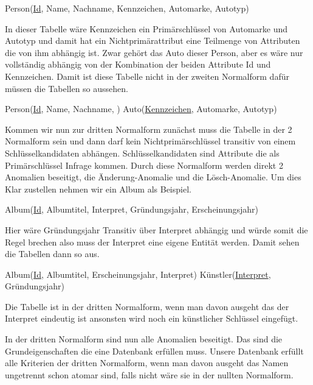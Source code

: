 \begin{small}
	Person(\uline{Id}, Name, Nachname, Kennzeichen, Automarke, Autotyp)
\end{small}

In dieser Tabelle wäre Kennzeichen ein Primärschlüssel von Automarke und Autotyp und damit hat ein Nichtprimärattribut eine Teilmenge von Attributen die von ihm abhängig ist. Zwar gehört das Auto dieser Person, aber es wäre nur vollständig abhängig von der Kombination der beiden Attribute Id und Kennzeichen. Damit ist diese Tabelle nicht in der zweiten Normalform dafür müssen die Tabellen so aussehen.

\begin{small}
	Person(\uline{Id}, Name, Nachname, )\newline
	Auto(\uline{Kennzeichen}, Automarke, Autotyp)
\end{small}

Kommen wir nun zur dritten Normalform zunächst muss die Tabelle in der 2 Normalform sein und dann darf kein Nichtprimärschlüssel transitiv von einem Schlüsselkandidaten abhängen. Schlüsselkandidaten sind Attribute die als Primärschlüssel Infrage kommen. Durch diese Normalform werden direkt 2 Anomalien beseitigt, die Änderung-Anomalie und die Lösch-Anomalie. Um dies Klar zustellen nehmen wir ein Album als Beispiel.

\begin{small}
	Album(\uline{Id}, Albumtitel, Interpret, Gründungsjahr, Erscheinungsjahr)
\end{small}

Hier wäre Gründungsjahr Transitiv über Interpret abhängig und würde somit die Regel brechen also muss der Interpret eine eigene Entität werden. Damit sehen die Tabellen dann so aus.

\begin{small}
	Album(\uline{Id}, Albumtitel, Erscheinungsjahr, Interpret)\newline
	Künstler(\uline{Interpret}, Gründungsjahr)
\end{small}

Die Tabelle ist in der dritten Normalform, wenn man davon ausgeht das der Interpret eindeutig ist ansonsten wird noch ein künstlicher Schlüssel eingefügt. 

In der dritten Normalform sind nun alle Anomalien beseitigt. Das sind die Grundeigenschaften die eine Datenbank erfüllen muss. Unsere Datenbank erfüllt alle Kriterien der dritten Normalform, wenn man davon ausgeht das Namen ungetrennt schon atomar sind, falls nicht wäre sie in der nullten Normalform.

